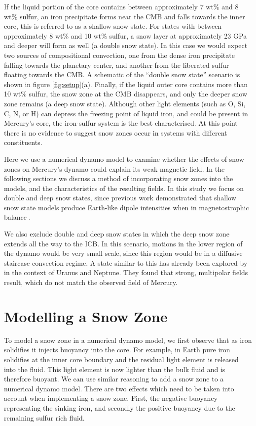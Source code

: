 If the liquid portion of the core contains between approximately 7 wt\% and 8 wt\% sulfur, an iron precipitate forms near the CMB and falls towards the inner core, this is referred to as a shallow snow state. For states with between approximately 8 wt\% and 10 wt\% sulfur, a snow layer at approximately 23 GPa and deeper will form as well (a double snow state). In this case we would expect two sources of compositional convection, one from the dense iron precipitate falling towards the planetary center, and another from the liberated sulfur floating towards the CMB. A schematic of the ``double snow state'' scenario is shown in figure \ref{fig:setup}(a). Finally, if the liquid outer core contains more than 10 wt\% sulfur, the snow zone at the CMB disappears, and only the deeper snow zone remains (a deep snow state). Although other light elements (such as O, Si, C, N, or H) can depress the freezing point of liquid iron, and could be present in Mercury's core, the iron-sulfur system is the best characterised. At this point there is no evidence to suggest snow zones occur in systems with different constituents. 

Here we use a numerical dynamo model to examine whether the effects of snow zones on Mercury's dynamo could explain its weak magnetic field. In the following sections we discuss a method of incorporating snow zones into the models, and the characteristics of the resulting fields. In this study we focus on double and deep snow states, since previous work demonstrated that shallow snow state models produce Earth-like dipole intensities when in magnetostrophic balance \citep{stanleyandmohammadi}.

We also exclude double and deep snow states in which the deep snow zone extends all the way to the ICB. In this scenario, motions in the lower region of the dynamo would be very small scale, since this region would be in a diffusive staircase convection regime. A state similar to this has already been explored by \citet{stanleyandbloxham2006} in the context of Uranus and Neptune. They found that strong, multipolar fields result, which do not match the observed field of Mercury.

\section{Modelling a Snow Zone}
To model a snow zone in a numerical dynamo model, we first observe that as iron solidifies it injects buoyancy into the core. For example, in Earth pure iron solidifies at the inner core boundary and the residual light element is released into the fluid. This light element is now lighter than the bulk fluid and is therefore buoyant. We can use similar reasoning to add a snow zone to a numerical dynamo model. There are two effects which need to be taken into account when implementing a snow zone. First, the negative buoyancy representing the sinking iron, and secondly the positive buoyancy due to the remaining sulfur rich fluid.

